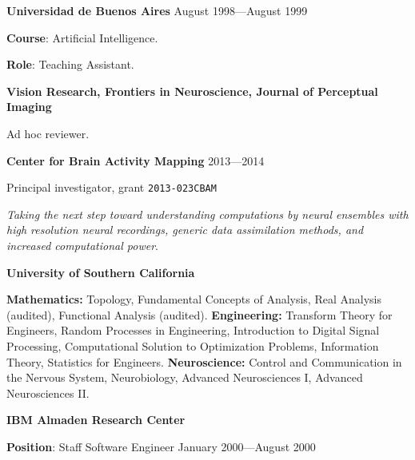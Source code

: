 \documentclass{article}
\begin{document}
\par
\vspace{.1in}
{\bf Universidad de Buenos Aires} \hspace*{\fill} August 1998---August 1999
\par
{\bf Course}: Artificial Intelligence.
\par
{\bf Role}: Teaching Assistant.

\par
\vspace{2\baselineskip}
{\bf Vision Research, Frontiers in Neuroscience, Journal of Perceptual Imaging}
\par
Ad hoc reviewer.
\par

\par
\vspace{2\baselineskip}
{\bf Center for Brain Activity Mapping}  \hspace*{\fill} 2013---2014
\par
Principal investigator, grant \texttt{2013-023CBAM}
\par
\emph{Taking the next step toward understanding computations by neural
ensembles with high resolution neural recordings, generic data assimilation
methods, and increased computational power}.

\par
\vspace{2\baselineskip}
{\bf University of Southern California}
\par
{}
{\bf Mathematics:} Topology, Fundamental Concepts of Analysis, Real Analysis (audited), Functional Analysis (audited). {\bf Engineering:} Transform Theory for Engineers, Random Processes in Engineering, Introduction to Digital Signal Processing, Computational Solution to Optimization Problems, Information Theory, Statistics for Engineers. {\bf Neuroscience:} Control and Communication in the Nervous System, Neurobiology, Advanced Neurosciences I, Advanced Neurosciences II.\par
\par

\vspace{2\baselineskip}
{\bf IBM Almaden Research Center}
\par
{\bf Position}:  Staff Software Engineer
\hspace*{\fill} January 2000---August 2000
\end{document}
